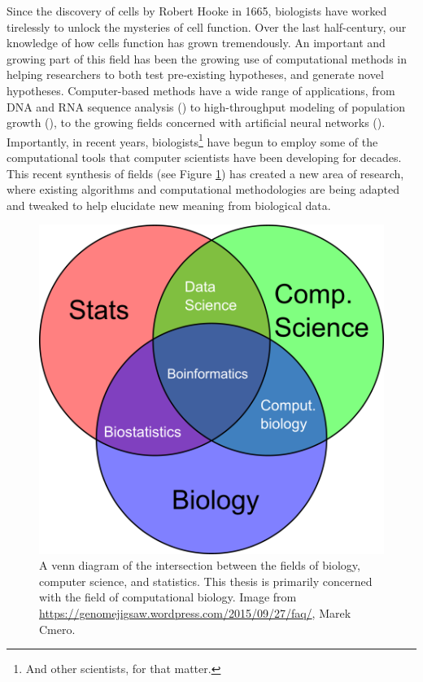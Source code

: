 \documentclass[12pt,twoside]{reedthesis}
\theoremstyle{definition}
\begin{document}
\onehalfspacing

Since the discovery of cells by Robert Hooke in 1665, biologists have worked tirelessly to unlock the mysteries of cell function. Over the last half-century, our knowledge of how cells function has grown tremendously. An important and growing part of this field has been the growing use of computational methods in helping researchers to both test pre-existing hypotheses, and generate novel hypotheses. Computer-based methods have a wide range of applications, from DNA and RNA sequence analysis (\cite{humanGenome}) to high-throughput modeling of population growth (\cite{Anderson2005}), to the growing fields concerned with artificial neural networks (\cite{Chon1996}). Importantly, in recent years, biologists\footnote{And other scientists, for that matter.} have begun to employ some of the computational tools that computer scientists have been developing for decades. This recent synthesis of fields (see Figure \ref{fig:bioinf_venn}) has created a new area of research, where existing algorithms and computational methodologies are being adapted and tweaked to help elucidate new meaning from biological data.\par

 \begin{figure}[!h]
   \begin{center}
     \includegraphics[width=\textwidth/2]{bioinformatics_venn}
   \caption[Bioinformatic fields.]{A venn diagram of the intersection between the fields of biology, computer science, and statistics. This thesis is primarily concerned with the field of computational biology. Image from \url{https://genomejigsaw.wordpress.com/2015/09/27/faq/}, Marek Cmero.}
   \label{fig:bioinf_venn}
   \end{center}
 \end{figure}
\end{document}
